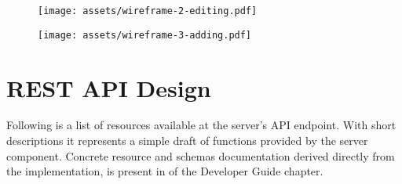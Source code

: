 \begin{figure}[h]{}
\centering\texttt{[image: assets/wireframe-2-editing.pdf]}
\caption{}

\end{figure}

\begin{figure}[h]{}
\centering\texttt{[image: assets/wireframe-3-adding.pdf]}
\caption{}

\end{figure}

\hypertarget{x-rest-api-design}{\section{REST API Design}}
Following is a list of resources available at the server’s API endpoint.
With short descriptions it represents a simple draft of functions provided 
by the server component.
Concrete resource and schemas documentation derived
directly from the implementation, is present
in \hyperlink{./13-developer-guide#server-api}{} of the
Developer Guide chapter.

